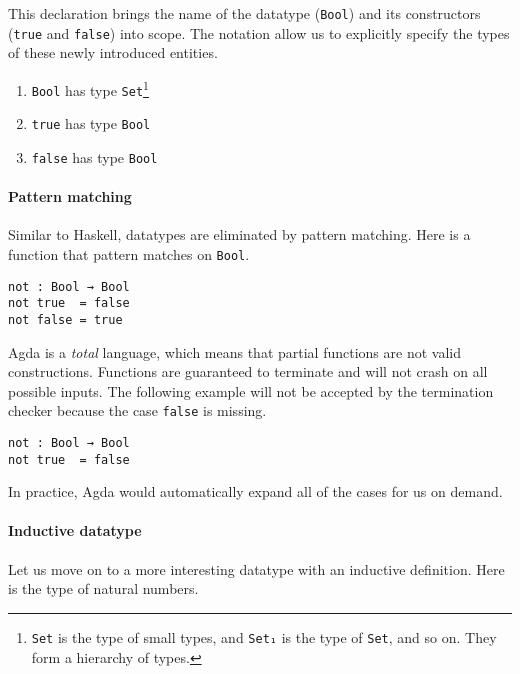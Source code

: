 \documentclass[../thesis.tex]{subfiles}
\begin{document}
This declaration brings the name of the datatype ({\lstinline|Bool|})
and its constructors ({\lstinline|true|} and {\lstinline|false|}) into scope.
The notation allow us to explicitly specify the types of these newly introduced
entities.

\begin{enumerate}
    \item {\lstinline|Bool|} has type {\lstinline|Set|}\footnote{{\lstinline|Set|} is the type of small types, and {\lstinline|Set₁|} is the type
of {\lstinline|Set|}, and so on. They form a hierarchy of types.}
    \item {\lstinline|true|} has type {\lstinline|Bool|}
    \item {\lstinline|false|} has type {\lstinline|Bool|}
\end{enumerate}

\paragraph{Pattern matching}

Similar to Haskell, datatypes are eliminated by pattern matching.
Here is a function that pattern matches on {\lstinline|Bool|}.

\begin{lstlisting}
not : Bool → Bool
not true  = false
not false = true
\end{lstlisting}

Agda is a \textit{total} language,
which means that partial functions are not valid constructions.
Functions are guaranteed to terminate and will not crash on all possible inputs.
The following example will not be accepted by the termination checker because the case
{\lstinline|false|} is missing.


\begin{lstlisting}
not : Bool → Bool
not true  = false
\end{lstlisting}

In practice, Agda would automatically expand all of the cases for us on demand.

\paragraph{Inductive datatype} Let us move on to a more interesting datatype with
an inductive definition. Here is the type of natural numbers.
\end{document}
